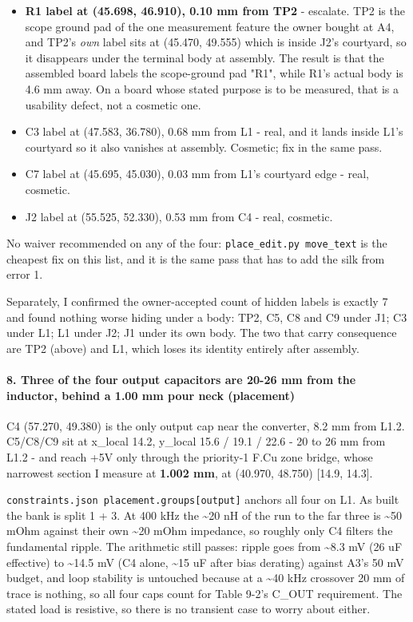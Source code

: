 \documentclass[11pt,a4paper]{article}
\begin{document}
\begin{itemize}
\item \textbf{R1 label at (45.698, 46.910), 0.10 mm from TP2} - escalate. TP2 is the scope
ground pad of the one measurement feature the owner bought at A4, and TP2's \emph{own}
label sits at (45.470, 49.555) which is inside J2's courtyard, so it disappears
under the terminal body at assembly. The result is that the assembled board labels
the scope-ground pad "R1", while R1's actual body is 4.6 mm away. On a board whose
stated purpose is to be measured, that is a usability defect, not a cosmetic one.
\item C3 label at (47.583, 36.780), 0.68 mm from L1 - real, and it lands inside L1's
courtyard so it also vanishes at assembly. Cosmetic; fix in the same pass.
\item C7 label at (45.695, 45.030), 0.03 mm from L1's courtyard edge - real, cosmetic.
\item J2 label at (55.525, 52.330), 0.53 mm from C4 - real, cosmetic.
\end{itemize}
No waiver recommended on any of the four: \texttt{place\_edit.py move\_text} is the cheapest fix on this list, and it is the same pass that has to add the silk from error 1.

Separately, I confirmed the owner-accepted count of hidden labels is exactly 7 and found nothing worse hiding under a body: TP2, C5, C8 and C9 under J1; C3 under L1; L1 under J2; J1 under its own body. The two that carry consequence are TP2 (above) and L1, which loses its identity entirely after assembly.

\paragraph*{8. Three of the four output capacitors are 20-26 mm from the inductor, behind a 1.00 mm pour neck (placement)}
C4 (57.270, 49.380) is the only output cap near the converter, 8.2 mm from L1.2. C5/C8/C9 sit at x\_local 14.2, y\_local 15.6 / 19.1 / 22.6 - 20 to 26 mm from L1.2 - and reach +5V only through the priority-1 F.Cu zone bridge, whose narrowest section I measure at \textbf{1.002 mm}, at (40.970, 48.750) {[}14.9, 14.3{]}.

\texttt{constraints.json placement.groups{[}output{]}} anchors all four on L1. As built the bank is split 1 + 3. At 400 kHz the \textasciitilde{}20 nH of the run to the far three is \textasciitilde{}50 mOhm against their own \textasciitilde{}20 mOhm impedance, so roughly only C4 filters the fundamental ripple. The arithmetic still passes: ripple goes from \textasciitilde{}8.3 mV (26 uF effective) to \textasciitilde{}14.5 mV (C4 alone, \textasciitilde{}15 uF after bias derating) against A3's 50 mV budget, and loop stability is untouched because at a \textasciitilde{}40 kHz crossover 20 mm of trace is nothing, so all four caps count for Table 9-2's C\_OUT requirement. The stated load is resistive, so there is no transient case to worry about either.
\end{document}
